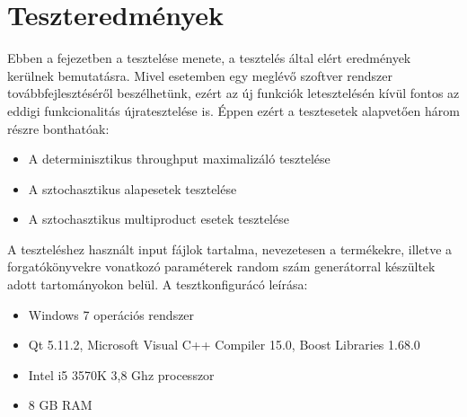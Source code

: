 \chapter{Teszteredmények} \label{Testing}
Ebben a fejezetben a tesztelése menete, a tesztelés által elért eredmények kerülnek bemutatásra.
Mivel esetemben egy meglévő szoftver rendszer továbbfejlesztéséről beszélhetünk, ezért az új funkciók letesztelésén kívül fontos az eddigi funkcionalitás újratesztelése is.
Éppen ezért a tesztesetek alapvetően három részre bonthatóak:
\begin{itemize}
\item A determinisztikus throughput maximalizáló tesztelése
\item A sztochasztikus alapesetek tesztelése
\item A sztochasztikus multiproduct esetek tesztelése
\end{itemize}
A teszteléshez használt input fájlok tartalma, nevezetesen a termékekre, illetve a forgatókönyvekre vonatkozó paraméterek random szám generátorral készültek adott tartományokon belül.
A tesztkonfigurácó leírása:
\begin{itemize}
\item Windows 7 operációs rendszer 
\item Qt 5.11.2, Microsoft Visual C++ Compiler 15.0, Boost Libraries 1.68.0
\item Intel i5 3570K 3,8 Ghz processzor
\item 8 GB RAM
\end{itemize}
